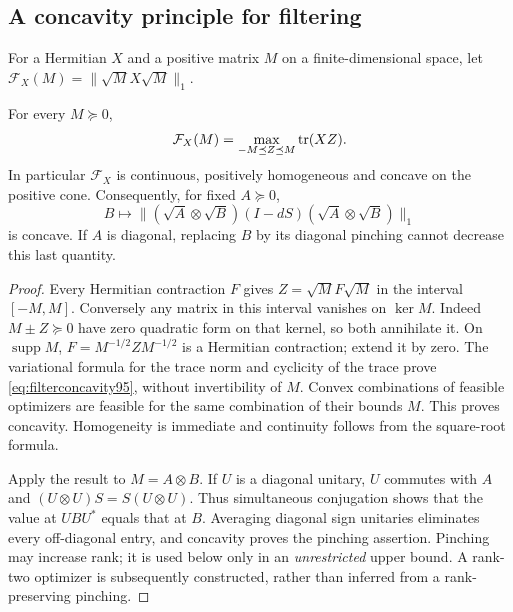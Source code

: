 \subsection{A concavity principle for filtering}
For a Hermitian $X$ and a positive matrix $M$ on a finite-dimensional
space, let $\mathcal F_X(M)=\|\sqrt M X\sqrt M\|_1$.
\begin{lemma}\label{lem:filterconcavity95}
For every $M\succeq0$,
\begin{equation}\label{eq:filterconcavity95}
 \mathcal F_X(M)
  =\max_{-M\preceq Z\preceq M}\operatorname{tr}(XZ).
\end{equation}
In particular $\mathcal F_X$ is continuous, positively homogeneous
and concave on the positive cone.  Consequently, for fixed $A\succeq0$,
\[
 B\longmapsto
 \|(\sqrt A\otimes\sqrt B)(I-dS)(\sqrt A\otimes\sqrt B)\|_1
\]
is concave.  If $A$ is diagonal, replacing $B$ by its diagonal
pinching cannot decrease this last quantity.
\end{lemma}
\begin{proof}
Every Hermitian contraction $F$ gives
$Z=\sqrt M F\sqrt M$ in the interval $[-M,M]$.
Conversely any matrix in this interval vanishes on $\ker M$.
Indeed $M\pm Z\succeq0$ have zero quadratic form on that kernel,
so both annihilate it.  On $\operatorname{supp}M$,
$F=M^{-1/2}ZM^{-1/2}$ is a Hermitian contraction; extend it by zero.
The variational formula for the trace norm and cyclicity of the trace
prove \eqref{eq:filterconcavity95}, without invertibility of $M$.
Convex combinations of feasible optimizers are feasible for the same
combination of their bounds $M$.  This proves concavity.  Homogeneity
is immediate and continuity follows from the square-root formula.

Apply the result to $M=A\otimes B$.  If $U$ is a diagonal unitary,
$U$ commutes with $A$ and $(U\otimes U)S=S(U\otimes U)$.
Thus simultaneous conjugation shows that the value at $UBU^*$ equals
that at $B$.  Averaging diagonal sign unitaries eliminates every
off-diagonal entry, and concavity proves the pinching assertion.
Pinching may increase rank; it is used below only in an
\emph{unrestricted} upper bound.  A rank-two optimizer is subsequently
constructed, rather than inferred from a rank-preserving pinching.
\end{proof}

